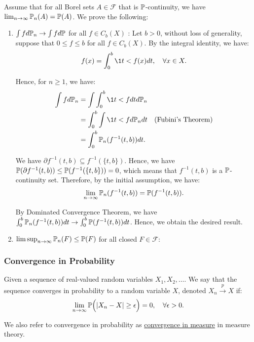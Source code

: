 \begin{proof*}
    Assume that for all Borel sets $A\in\mathcal{F}$ that is $\mathbb{P}$-continuity, we have $\lim_{n\to\infty} \mathbb{P}_n(A) = \mathbb{P}(A)$. We prove the following: 
    \begin{enumerate}
        \item $\int fd\mathbb{P}_n \to \int fd\mathbb{P}$ for all $f\in C_b(X)$ : Let $b>0$, without loss of generality, suppose that $0\le f \le b$ for all $f\in C_b(X)$. By the integral identity, we have:
        \begin{align*}
            f(x) = \int_0^b \1{t < f(x)}dt, \quad \forall x\in X.    
        \end{align*}

        \noindent Hence, for $n\ge 1$, we have:
        \begin{align*}
            \int f d\Pm_n &= \int \int_0^b \1{t < f}dt d\Pm_n \\
                &= \int_0^b \int \1{t < f}d\Pm_n dt \quad \text{(Fubini's Theorem)} \\
                &= \int_0^b \Pm_n(f^{-1}(t, b))dt.
        \end{align*} 

        \noindent We have $\partial f^{-1}(t, b) \subseteq f^{-1}(\{t, b\})$. Hence, we have $\mathbb{P}(\partial f^{-1}(t, b)) \le \mathbb{P}(f^{-1}(\{t, b\})) = 0$, which means that $f^{-1}(t, b)$ is a $\mathbb{P}$-continuity set. Therefore, by the initial assumption, we have:
        \begin{align*}
            \lim_{n\to\infty} \mathbb{P}_n(f^{-1}(t, b)) = \mathbb{P}(f^{-1}(t, b)). 
        \end{align*} 

        \noindent By Dominated Convergence Theorem, we have $\int_0^b \mathbb{P}_n(f^{-1}(t, b))dt \to \int_0^b \mathbb{P}(f^{-1}(t, b))dt$. Hence, we obtain the desired result.

        \item $\limsup_{n\to\infty}\mathbb{P}_n(F) \le \mathbb{P}(F)$ for all closed $F\in\mathcal{F}$:
    \end{enumerate} 
\end{proof*} 

\subsubsection{Convergence in Probability}
\begin{definition}
    Given a sequence of real-valued random variables $X_1, X_2, \dots$. We say that the sequence converges in probability to a random variable $X$, denoted $X_n\xrightarrow{p}X$ if:
    \begin{equation}
        \lim_{n\to\infty} \mathbb{P}\Big( |X_n - X| \ge \epsilon \Big) = 0, \quad \forall \epsilon > 0.
    \end{equation}

    \noindent We also refer to convergence in probability as \underline{convergence in measure} in measure theory.
\end{definition}

